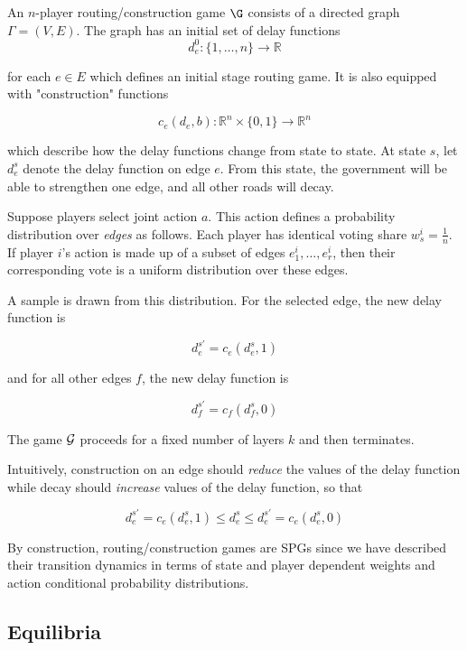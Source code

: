\begin{mydef}
An $n$-player routing/construction game $\G$ consists of a directed graph $\Gamma = (V, E)$. The graph has an initial set of delay functions 
$$
d^0_{e} : \{1, \ldots, n\} \rightarrow \mathbb{R}
$$ 

\noindent for each $e \in E$ which defines an initial stage routing game. It is also equipped with "construction" functions

$$
c_{e}(d_{e}, b): \mathbb{R}^n \times \{0,1\} \rightarrow \mathbb{R}^n
$$

\noindent which describe how the delay functions change from state to state. At state $s$, let $d^s_e$ denote the delay function on edge $e$. From this state, the government will be able to strengthen one edge, and all other roads will decay. 

Suppose players select joint action $a$. This action defines a probability distribution over {\em edges} as follows. Each player has identical voting share $w^i_{s} = \frac{1}{n}$. If player $i$'s action is made up of a subset of edges $e_1^i, \ldots, e_r^i$, then their corresponding vote is a uniform distribution over these edges.

A sample is drawn from this distribution. For the selected edge, the new delay function is

$$
d_e^{s'} = c_{e}(d_{e}^{s}, 1)
$$

and for all other edges $f$, the new delay function is 

$$
d_f^{s'} = c_{f}(d_{f}^{s}, 0)
$$

The game $\mathcal{G}$ proceeds for a fixed number of layers $k$ and then terminates.

Intuitively, construction on an edge should {\em reduce} the values of the delay function while decay should {\em increase} values of the delay function, so that

$$
d_e^{s'} = c_{e}(d_{e}^{s}, 1) \leq d_{e}^s \leq d_e^{s'} = c_{e}(d_{e}^{s}, 0)
$$

\end{mydef}

By construction, routing/construction games are SPGs since we have described their transition dynamics in terms of state and player dependent weights and action conditional probability distributions. 


\subsection{Equilibria}


